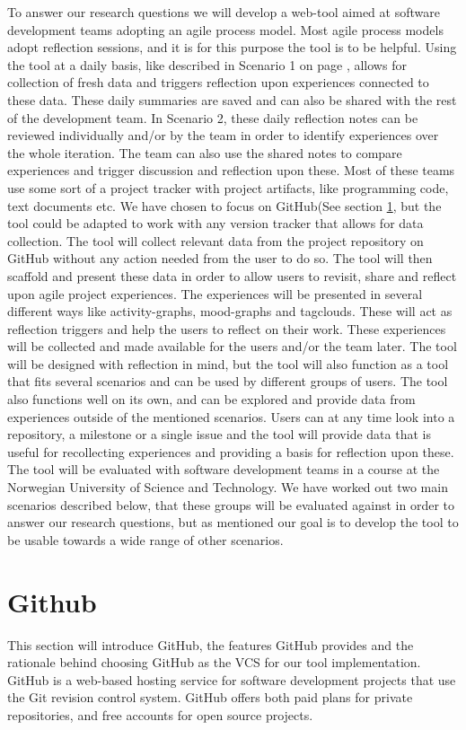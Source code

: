 To answer our research questions we will develop a web-tool aimed at software development teams adopting an agile process model. Most agile process models adopt reflection sessions, and it is for this purpose the tool is to be helpful. Using the tool at a daily basis, like described in Scenario 1 on page \pageref{scenario1}, allows for collection of fresh data and triggers reflection upon experiences connected to these data. These daily summaries are saved and can also be shared with the rest of the development team. In Scenario 2, these daily reflection notes can be reviewed individually and/or by the team in order to identify experiences over the whole iteration. The team can also use the shared notes to compare experiences and trigger discussion and reflection upon these. 
Most of these teams use some sort of a project tracker with project artifacts, like programming code, text documents etc. We have chosen to focus on GitHub(See section \ref{githubchapter}, but the tool could be adapted to work with any version tracker that allows for data collection. The tool will collect relevant data from the project repository on GitHub without any action needed from the user to do so. The tool will then scaffold and present these data in order to allow users to revisit, share and reflect upon agile project experiences.
The experiences will be presented in several different ways like activity-graphs, mood-graphs and tagclouds. These will act as reflection triggers and help the users to reflect on their work. These experiences will be collected and made available for the users and/or the team later. The tool will be designed with reflection in mind, but the tool will also function as 
a tool that fits several scenarios and can be used by different groups of users. The tool also functions well on its own, and can be explored and provide data from experiences outside of the mentioned scenarios. Users can at any time look into a repository, a milestone or a single issue and the tool will provide data that is useful for recollecting experiences and providing a basis for reflection upon these. 
The tool will be evaluated with software development teams in a course at the Norwegian University of Science and Technology. We have worked out two main scenarios described below, that these groups will be evaluated against in order to answer our research questions, but as mentioned our goal is to develop the tool to be usable towards a wide range of other scenarios. 

\section{Github}
\label{githubchapter}
This section will introduce GitHub, the features GitHub provides and the rationale behind choosing GitHub as the VCS for our tool implementation. 
GitHub is a web-based hosting service for software development projects that use the Git revision control system\cite{git,github}. GitHub offers both paid plans for private repositories, and free accounts for open source projects.

